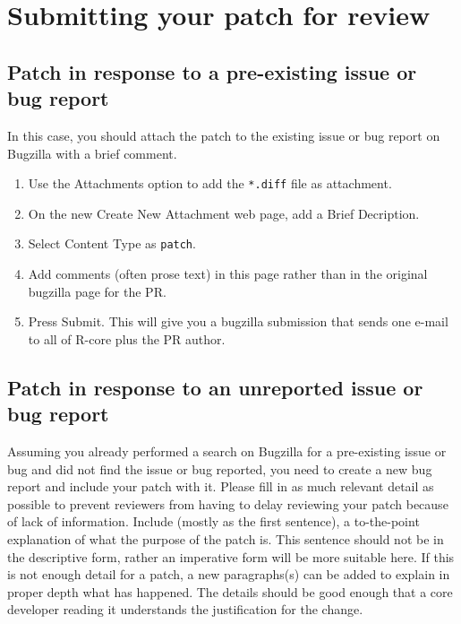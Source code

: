 \documentclass[
  letterpaper,
  DIV=11,
  numbers=noendperiod]{scrreprt}
\begin{document}
\section{Submitting your patch for review}\label{SubmitPatches}

\subsection{Patch in response to a pre-existing issue or bug
report}\label{patch-in-response-to-a-pre-existing-issue-or-bug-report}

In this case, you should attach the patch to the existing issue or bug
report on Bugzilla with a brief comment.

\begin{enumerate}
\def\labelenumi{\arabic{enumi}.}
\item
  Use the Attachments option to add the \texttt{*.diff} file as
  attachment.
\item
  On the new Create New Attachment web page, add a Brief Decription.
\item
  Select Content Type as \texttt{patch}.
\item
  Add comments (often prose text) in this page rather than in the
  original bugzilla page for the PR.
\item
  Press Submit. This will give you a bugzilla submission that sends one
  e-mail to all of R-core plus the PR author.
\end{enumerate}

\subsection{Patch in response to an unreported issue or bug
report}\label{patch-in-response-to-an-unreported-issue-or-bug-report}

Assuming you already performed a search on Bugzilla for a pre-existing
issue or bug and did not find the issue or bug reported, you need to
create a new bug report and include your patch with it. Please fill in
as much relevant detail as possible to prevent reviewers from having to
delay reviewing your patch because of lack of information. Include
(mostly as the first sentence), a to-the-point explanation of what the
purpose of the patch is. This sentence should not be in the descriptive
form, rather an imperative form will be more suitable here. If this is
not enough detail for a patch, a new paragraphs(s) can be added to
explain in proper depth what has happened. The details should be good
enough that a core developer reading it understands the justification
for the change.
\end{document}
